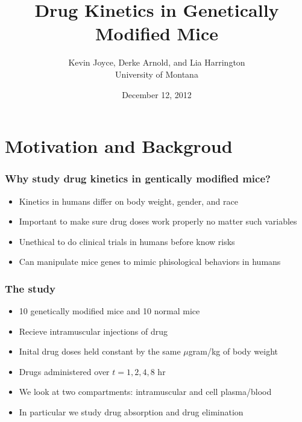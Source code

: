 \documentclass[t]{beamer}
\title{Drug Kinetics in Genetically Modified Mice}
\author{Kevin Joyce, Derke Arnold, and Lia Harrington \\
        University of Montana}
\date{December 12, 2012}
\begin{document}

\begin{frame}
\titlepage
\end{frame}

\section{Motivation and Backgroud}

\begin{frame}
\frametitle{Why study drug kinetics in gentically modified mice?}
\begin{itemize}
  \item Kinetics in humans differ on body weight, gender, and race
  \item Important to make sure drug doses work properly no matter such variables
  \item Unethical to do clinical trials in humans before know risks
  \item Can manipulate mice genes to mimic phisological behaviors in humans
\end{itemize}
\end{frame}
\begin{frame}
\frametitle{The study}
\begin{itemize}
\item 10 genetically modified mice and 10 normal mice
\item Recieve intramuscular injections of drug
\item Inital drug doses held constant by the same $\mu$gram/kg of body weight
\item Drugs administered over $t = 1, 2, 4, 8$ hr
\item We look at two compartments: intramuscular and cell plasma/blood
\item In particular we study drug absorption and drug elimination 
\end{itemize}
\end{frame}
\end{document}
